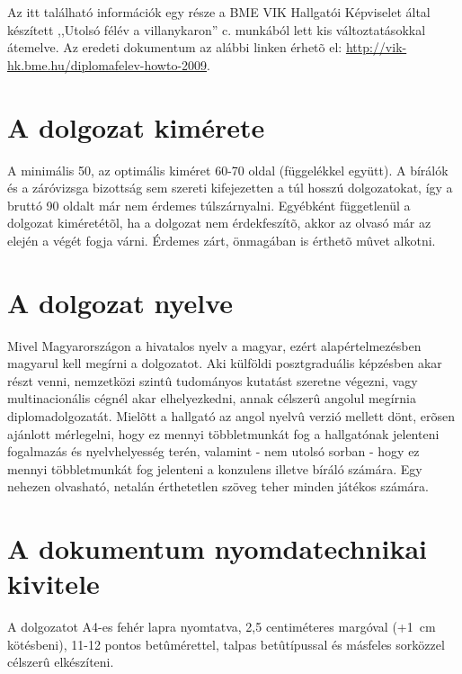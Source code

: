 Az itt található információk egy része a BME VIK Hallgatói Képviselet által készített ,,Utolsó félév a villanykaron'' c. munkából lett kis változtatásokkal átemelve. Az eredeti dokumentum az alábbi linken érhetõ el: \url{http://vik-hk.bme.hu/diplomafelev-howto-2009}.

\section{A dolgozat kimérete}
A minimális 50, az optimális kiméret 60-70 oldal (függelékkel együtt). A bírálók és a záróvizsga bizottság sem szereti kifejezetten a túl hosszú dolgozatokat, így a bruttó 90 oldalt már nem érdemes túlszárnyalni. Egyébként függetlenül a dolgozat kiméretétõl, ha a dolgozat nem érdekfeszítõ, akkor az olvasó már az elején a végét fogja várni. Érdemes zárt, önmagában is érthetõ mûvet alkotni.

\section{A dolgozat nyelve}
Mivel Magyarországon a hivatalos nyelv a magyar, ezért alapértelmezésben magyarul kell megírni a dolgozatot. Aki külföldi posztgraduális képzésben akar részt venni, nemzetközi szintû tudományos kutatást szeretne végezni, vagy multinacionális cégnél akar elhelyezkedni, annak célszerû angolul megírnia diplomadolgozatát. Mielõtt a hallgató az angol nyelvû verzió mellett dönt, erõsen ajánlott mérlegelni, hogy ez mennyi többletmunkát fog a hallgatónak jelenteni fogalmazás és nyelvhelyesség terén, valamint - nem utolsó sorban - hogy ez mennyi többletmunkát fog jelenteni a konzulens illetve bíráló számára. Egy nehezen olvasható, netalán érthetetlen szöveg teher minden játékos számára.

\section{A dokumentum nyomdatechnikai kivitele}
A dolgozatot A4-es fehér lapra nyomtatva, 2,5 centiméteres margóval (+1~cm kötésbeni), 11-12 pontos betûmérettel, talpas betûtípussal és másfeles sorközzel célszerû elkészíteni.


